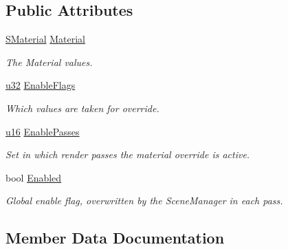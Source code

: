 \subsection*{Public Attributes}
\begin{DoxyCompactItemize}
\item 
\hyperlink{classirr_1_1video_1_1SMaterial}{S\+Material} \hyperlink{structirr_1_1video_1_1SOverrideMaterial_a592954208c68e970a200a208d3243b5f}{Material}\hypertarget{structirr_1_1video_1_1SOverrideMaterial_a592954208c68e970a200a208d3243b5f}{}\label{structirr_1_1video_1_1SOverrideMaterial_a592954208c68e970a200a208d3243b5f}

\begin{DoxyCompactList}\small\item\em The Material values. \end{DoxyCompactList}\item 
\hyperlink{namespaceirr_a0416a53257075833e7002efd0a18e804}{u32} \hyperlink{structirr_1_1video_1_1SOverrideMaterial_a58b20260b94f880ab4680e08c098e2f4}{Enable\+Flags}
\begin{DoxyCompactList}\small\item\em Which values are taken for override. \end{DoxyCompactList}\item 
\hyperlink{namespaceirr_ae9f8ec82692ad3b83c21f555bfa70bcc}{u16} \hyperlink{structirr_1_1video_1_1SOverrideMaterial_af809f3d1a4408b8369ee94295cf01e4a}{Enable\+Passes}
\begin{DoxyCompactList}\small\item\em Set in which render passes the material override is active. \end{DoxyCompactList}\item 
bool \hyperlink{structirr_1_1video_1_1SOverrideMaterial_ab2606fe0a478e59ec7bcd37dd0f4125a}{Enabled}
\begin{DoxyCompactList}\small\item\em Global enable flag, overwritten by the Scene\+Manager in each pass. \end{DoxyCompactList}\end{DoxyCompactItemize}


\subsection{Member Data Documentation}
